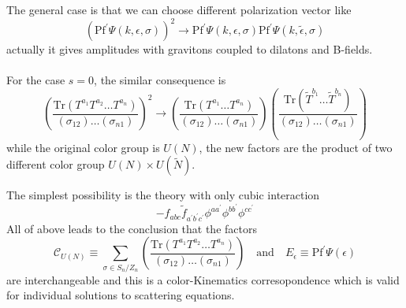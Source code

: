 \documentclass{beamer}
\begin{document}
\begin{frame}
    The general case is that we can choose different polarization vector like 
    \begin{equation*}
        \left(\mathrm{Pf}^\prime \Psi(k,\epsilon,\sigma)\right)^2\to\mathrm{Pf}^\prime \Psi(k,\epsilon,\sigma)\mathrm{Pf}^\prime \Psi(k,\tilde{\epsilon},\sigma)
    \end{equation*}
    actually it gives amplitudes with gravitons coupled to dilatons and B-fields.
    \\ \hspace*{\fill}\\
    \pause
    For the case $s=0$, the similar consequence is 
    \begin{equation*}
        \left(\frac{\mathrm{Tr}(T^{a_1}T^{a_2}\dots T^{a_n})}{(\sigma_{12})\dots (\sigma_{n1})}\right)^2\to\left(\frac{\mathrm{Tr}(T^{a_1}\dots T^{a_n})}{(\sigma_{12})\dots (\sigma_{n1})}\right)
        \left(\frac{\mathrm{Tr}(\tilde{T}^{b_1}\dots \tilde{T}^{b_n})}{(\sigma_{12})\dots (\sigma_{n1})}\right)
    \end{equation*}
    while the original color group is $U(N)$, the new factors are the product of two different color group \alert{$U(N)\times U(\tilde{N})$}.
\end{frame}
\begin{frame}
    The simplest possibility is the theory with only cubic interaction
    \begin{equation*}
        -f_{abc}\tilde{f}_{a^\prime b^\prime c^\prime}\phi^{aa^\prime}\phi^{bb^\prime}\phi^{cc^\prime}
    \end{equation*}
    All of above leads to the conclusion that the factors 
    \begin{equation*}
        \mathcal{C}_{U(N)}\equiv \sum_{\sigma\in S_n/Z_n}\left(\frac{\mathrm{Tr}(T^{a_1}T^{a_2}\dots T^{a_n})}{(\sigma_{12})\dots (\sigma_{n1})}\right)\quad \mathrm{and} \quad E_\epsilon\equiv\mathrm{Pf}^{'}\Psi(\epsilon)
    \end{equation*}
    are interchangeable and this is a color-Kinematics corresopondence which is valid for individual solutions to scattering equations.
   
\end{frame}
\end{document}
